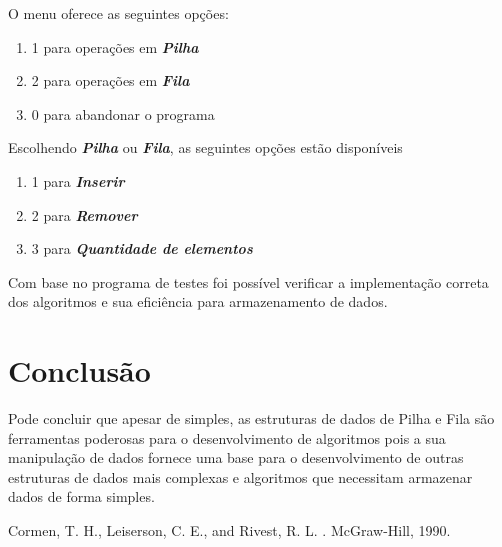 \documentclass[rascunho,xindy,sublist]{fei}
\begin{document}
O menu oferece as seguintes opções:

\begin{enumerate}
  \item 1 para operações em \textbf{\textit{Pilha}}
  \item 2 para operações em \textbf{\textit{Fila}}
  \item 0 para abandonar o programa
\end{enumerate}

Escolhendo \textbf{\textit{Pilha}} ou \textbf{\textit{Fila}}, as seguintes opções estão disponíveis

\begin{enumerate}
  \item 1 para \textbf{\textit{Inserir}}
  \item 2 para \textbf{\textit{Remover}}
  \item 3 para \textbf{\textit{Quantidade de elementos}}
\end{enumerate}

Com base no programa de testes foi possível verificar a implementação correta dos algoritmos e sua eficiência para armazenamento de dados.

\chapter{Conclusão}

Pode concluir que apesar de simples, as estruturas de dados de Pilha e Fila são ferramentas poderosas para o desenvolvimento de algoritmos pois a sua manipulação de dados fornece uma base para o desenvolvimento de outras estruturas de dados mais complexas e algoritmos que necessitam armazenar dados de forma simples.

\printbibliography

\printindex

\begin{thebibliography}{9}

{Cormen, T. H.}, {Leiserson, C. E.}, and {Rivest, R. L.}
.
\newblock McGraw-Hill, 1990.

\end{thebibliography}
\end{document}

